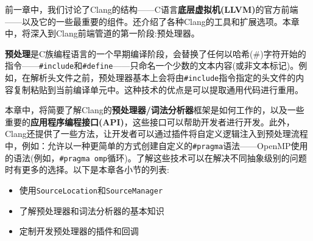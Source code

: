 前一章中，我们讨论了Clang的结构——C语言\textbf{底层虚拟机(LLVM)}的官方前端——以及它的一些最重要的组件。还介绍了各种Clang的工具和扩展选项。本章中，将深入到Clang前端管道的第一阶段:预处理器。

\textbf{预处理}是C族编程语言的一个早期编译阶段，会替换了任何以哈希(\#)字符开始的指令——\texttt{\#include}和\texttt{\#define}——只命名一个少数的文本内容(或非文本标记)。例如，在解析头文件之前，预处理器基本上会将由\texttt{\#include}指令指定的头文件的内容复制粘贴到当前编译单元中。这种技术的优点是可以提取通用代码进行重用。

本章中，将简要了解Clang的\textbf{预处理器/词法分析器}框架是如何工作的，以及一些重要的\textbf{应用程序编程接口(API)}，这些接口可以帮助开发者进行开发。此外，Clang还提供了一些方法，让开发者可以通过插件将自定义逻辑注入到预处理流程中，例如：允许以一种更简单的方式创建自定义的\texttt{\#pragma}语法——OpenMP使用的语法(例如，\texttt{\#pragma omp}循环)。了解这些技术可以在解决不同抽象级别的问题时有更多的选择。以下是本章各小节的列表:

\begin{itemize}
\item 使用\texttt{SourceLocation}和\texttt{SourceManager}
\item 了解预处理器和词法分析器的基本知识
\item 定制开发预处理器的插件和回调
\end{itemize}

















